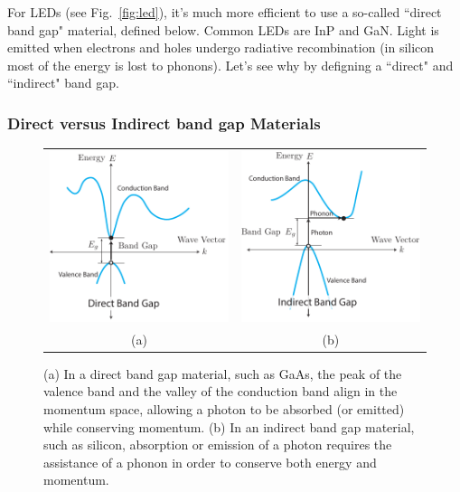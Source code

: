 For LEDs (see Fig.~\ref{fig:led}), it's much more efficient to use a so-called ``direct band gap" material, defined below.  Common LEDs are InP and GaN.  Light is emitted when electrons and holes undergo radiative recombination (in silicon most of the energy is lost to phonons).  Let's see why by defigning a ``direct" and ``indirect" band gap.
 
\subsubsection*{Direct versus Indirect band gap Materials}

\begin{figure}[tb]
\begin{center}
\begin{tabular}{cc}
\includegraphics[width=.4\columnwidth]{bandgap_direct} & 
\includegraphics[width=.4\columnwidth]{bandgap_indirect}\\
(a) & (b) \\
\end{tabular}
\end{center}
\caption{(a) In a direct band gap material, such as GaAs, the peak of the valence band and the valley of the conduction band align in the momentum space, allowing a photon to be absorbed (or emitted) while conserving momentum.  (b)  In an indirect band gap material, such as silicon, absorption or emission of a photon requires the assistance of a phonon in order to conserve both energy and momentum.  } \label{fig:band gap_direct}
\end{figure}

